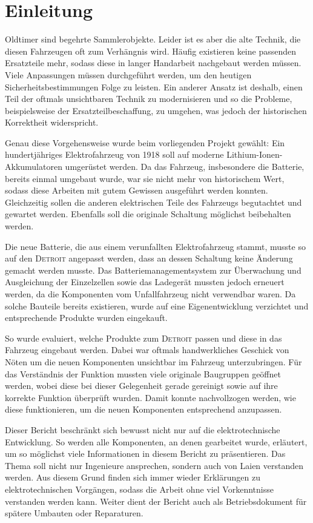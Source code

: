 \chapter{Einleitung}

\color{blue}
Oldtimer sind begehrte Sammlerobjekte. Leider ist es aber die alte Technik, die diesen Fahrzeugen oft zum Verhängnis wird. Häufig existieren keine passenden Ersatzteile mehr, sodass diese in langer Handarbeit nachgebaut werden müssen. Viele Anpassungen müssen durchgeführt werden, um den heutigen Sicherheitsbestimmungen Folge zu leisten. Ein anderer Ansatz ist deshalb, einen Teil der oftmals unsichtbaren Technik zu modernisieren und so die Probleme, beispielsweise der Ersatzteilbeschaffung, zu umgehen, was jedoch der historischen Korrektheit widerspricht.

Genau diese Vorgehensweise wurde beim vorliegenden Projekt gewählt: Ein hundertjähriges Elektrofahrzeug von 1918 soll auf moderne Lithium-Ionen-Akkumulatoren umgerüstet werden. Da das Fahrzeug, insbesondere die Batterie, bereits einmal umgebaut wurde, war sie nicht mehr von historischem Wert, sodass diese Arbeiten mit gutem Gewissen ausgeführt werden konnten. Gleichzeitig sollen die anderen elektrischen Teile des Fahrzeugs begutachtet und gewartet werden. Ebenfalls soll die originale Schaltung möglichst beibehalten werden.

Die neue Batterie, die aus einem verunfallten Elektrofahrzeug stammt, musste so auf den \linebreak\textsc{Detroit} angepasst werden, dass an dessen Schaltung keine Änderung gemacht werden musste. Das Batteriemanagementsystem zur Überwachung und Ausgleichung der Einzelzellen sowie das Ladegerät mussten jedoch erneuert werden, da die Komponenten vom Unfallfahrzeug nicht verwendbar waren. Da solche Bauteile bereits existieren, wurde auf eine Eigenentwicklung verzichtet und entsprechende Produkte wurden eingekauft.

So wurde evaluiert, welche Produkte zum \textsc{Detroit} passen und diese in das Fahrzeug eingebaut werden. Dabei war oftmals handwerkliches Geschick von Nöten um die neuen Komponenten unsichtbar im Fahrzeug unterzubringen. Für das Verständnis der Funktion mussten
viele originale Baugruppen geöffnet werden, wobei diese bei dieser Gelegenheit gerade gereinigt sowie auf ihre korrekte Funktion überprüft wurden. Damit konnte nachvollzogen werden, wie diese funktionieren, um die neuen Komponenten entsprechend anzupassen.

Dieser Bericht beschränkt sich bewusst nicht nur auf die elektrotechnische Entwicklung. So werden alle Komponenten, an denen gearbeitet wurde, erläutert, um so möglichst viele Informationen in diesem Bericht zu präsentieren. Das Thema soll nicht nur Ingenieure ansprechen, sondern auch von Laien verstanden werden. Aus diesem Grund finden sich immer wieder Erklärungen zu elektrotechnischen Vorgängen, sodass die Arbeit ohne viel Vorkenntnisse verstanden werden kann. Weiter dient der Bericht auch als Betriebsdokument für spätere Umbauten oder Reparaturen.
 \color{black}